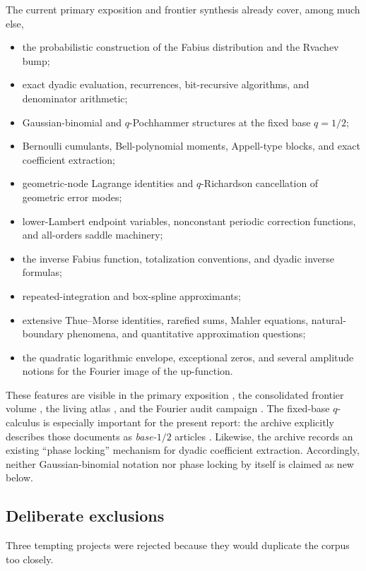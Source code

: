 \documentclass[11pt,oneside]{article}
\theoremstyle{definition}
\theoremstyle{remark}
\begin{document}
The current primary exposition and frontier synthesis already cover, among much else,
\begin{itemize}
\item the probabilistic construction of the Fabius distribution and the Rvachev bump;
\item exact dyadic evaluation, recurrences, bit-recursive algorithms, and denominator
      arithmetic;
\item Gaussian-binomial and $q$-Pochhammer structures at the fixed base $q=1/2$;
\item Bernoulli cumulants, Bell-polynomial moments, Appell-type blocks, and exact coefficient
      extraction;
\item geometric-node Lagrange identities and $q$-Richardson cancellation of geometric error
      modes;
\item lower-Lambert endpoint variables, nonconstant periodic correction functions, and
      all-orders saddle machinery;
\item the inverse Fabius function, totalization conventions, and dyadic inverse formulas;
\item repeated-integration and box-spline approximants;
\item extensive Thue--Morse identities, rarefied sums, Mahler equations, natural-boundary
      phenomena, and quantitative approximation questions;
\item the quadratic logarithmic envelope, exceptional zeros, and several amplitude notions
      for the Fourier image of the up-function.
\end{itemize}
These features are visible in the primary exposition \cite{proveitPrimary}, the consolidated
frontier volume \cite{proveitFrontiers}, the living atlas \cite{proveitAtlas}, and the
Fourier audit campaign \cite{proveitFourierAudit}.  The fixed-base $q$-calculus is especially
important for the present report: the archive explicitly describes those documents as
\emph{base-$1/2$} articles \cite{proveitArchive}.  Likewise, the archive records an existing
``phase locking'' mechanism for dyadic coefficient extraction.  Accordingly, neither
Gaussian-binomial notation nor phase locking by itself is claimed as new below.

\subsection{Deliberate exclusions}

Three tempting projects were rejected because they would duplicate the corpus too closely.
\end{document}
